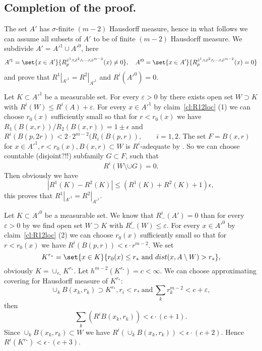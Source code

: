 
\subsection{Completion of the proof.}
The set $A'$ has $\sigma$-finite $(m-2)$ Hausdorff measure,
hence in what follows we can assume all subsets of $A'$ to
be of finite $(m-2)$ Hausdorff measure.
We subdivide $A'=A'^1\cup A'^0$, here
$$A'^1=\set{x\in A'}{R_p^{\mathring{v}^1\wedge \mathring{v}^2\wedge\dots\wedge
\mathring{v}^{m-2}}(x)\neq 0},
\quad
A'^0=\set{x\in A'}{R_p^{\mathring{v}^1\wedge \mathring{v}^2\wedge\dots\wedge
\mathring{v}^{m-2}}(x)= 0}$$
and prove that
$R^1|_{A'^1}=R^2|_{A'^1}$ and $R^i(A'^0)=0$.

Let $K\subset A'^1$ be a measurable set.
For every $\varepsilon>0$
 by \cite[2.2.2]{federer} there exists open set $W\supset K$ with
$R^i(W)\le R^i(A)+\varepsilon$.
For every $x\in A'^1$  by claim~\ref{cl:R12loc} (1)
   we can choose $r_0(x)$ sufficiently
small
so that for $r<r_0(x)$ we have
$R_1(B(x,r))/R_2(B(x,r))=1\pm \epsilon$ and
$ R^i(B(p,2r))<2\cdot 2^{m-2}(R_i(B(p,r)),\qquad i=1, 2$.
The set $F=B(x,r)$ for $x\in A'^1, r<r_0(x), B(x,r)\subset W$ is
$R^i$-adequate by  \cite[2.8.7]{federer}.
So we can choose countable (disjoint?!!) subfamily $G\subset F$, such that
$$R^i(W\setminus\cup G)=0.  $$
Then obviously
we have
$$|R^1(K)-R^2(K)|\le (R^1(K)+R^2(K)+1)\epsilon,$$
this proves that $R^1|_{A'^1}=R^2|_{A'^1}$.

Let $K\subset A'^0$ be a measurable set. We know that
$R^i_-(A')=0$ than for every $\varepsilon>0$
 by \cite[2.2.2]{federer} we find open set $W\supset K$ with
$R^i_-(W)\le \varepsilon$.
For every $x\in A'^0$  by claim~\ref{cl:R12loc} (2)
   we can choose $r_0(x)$ sufficiently
small
so that for $r<r_0(x)$ we have
$ R^i(B(p,r))<\epsilon\cdot r^{m-2}.$
We set
$$K^{r_*}
=
\set{x\in K}{r_0(x)\le r_*\ \text{and}\  dist(x,A\setminus W)>r_* },$$
obviously
$K=\cup_{r_*}K^{r_*}$. Let $h^{m-2}(K^{r_*})=c<\infty$.
We can choose approximating covering for Hausdorff measure of $K^{r_*}$:
$$\cup_k B(x_k,r_k)\supset K^{r_*}, r_i<r_*\  \text{and}\
\sum_k r_k^{m-2}< c+\varepsilon,$$
then $$\sum_k (R^i B(x_k,r_k))<\epsilon\cdot(c+1).$$
Since
$\cup_k B(x_k,r_k)\subset W$ we have
$R^i(\cup_k B(x_k,r_k))<\epsilon\cdot(c+2)$.
Hence $R^i(K^{r_*})<\epsilon\cdot(c+3)$.
